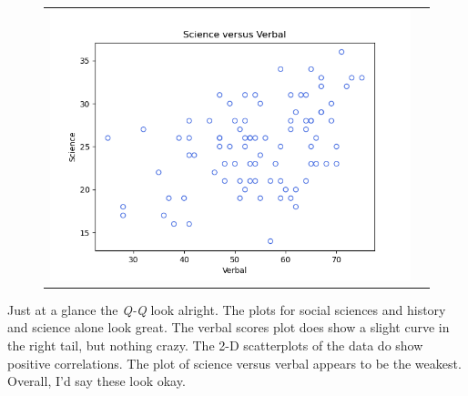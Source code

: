 \begin{enumerate}[label= (\alph*)]
\begin{figure}[H]
\begin{tabular}{cc}
            \includegraphics[scale=0.35]{./python/chapter-5/Question-5-18-c-xy-Verbal-Science.png}
        \end{tabular}
    \end{figure}
\end{enumerate}

Just at a glance the \textit{Q-Q} look alright. The plots for social sciences and history and science alone look great. The verbal scores plot does show a slight curve in the right tail, but nothing crazy. The 2-D scatterplots of the data do show positive correlations. The plot of science versus verbal appears to be the weakest. Overall, I'd say these look okay.
